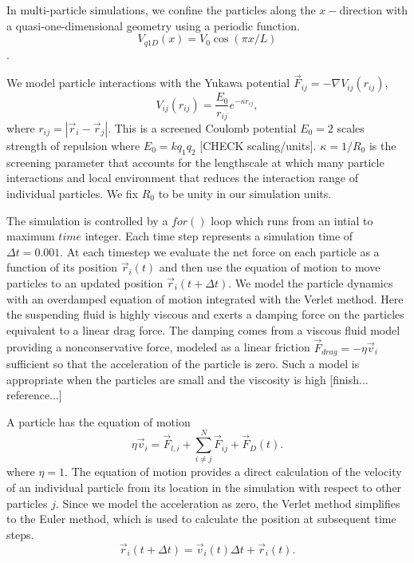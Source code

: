 \documentclass[prb,preprint]{revtex4}
\begin{document}
 In multi-particle simulations, we confine
 the particles along the $x-$direction with a
 quasi-one-dimensional geometry
 using a periodic function.
 \begin{equation}
   V_{q1D}(x) = V_0 \cos{(\pi x / L)}
 \end{equation}.
 
 We model particle interactions with
 the Yukawa potential $\vec{F}_{ij} = -\nabla V_{ij}(r_{ij})$,
 \begin{equation}
   V_{ij}(r_{ij}) = \frac{E_0}{r_{ij}} e^{-\kappa r_{ij}},
 \end{equation}
 where $r_{ij} = |\vec{r}_i - \vec{r}_j|$.
 This is a
 screened Coulomb potential
 $E_0=2$ scales strength of repulsion
 where $E_0 = k q_1 q_2$  [CHECK scaling/units].
 $\kappa = 1/R_0$ is the screening parameter 
that accounts for the lengthscale at
which many particle
interactions and local environment
that reduces the interaction range of individual particles.
We fix $R_0$ to be unity in our simulation units.

The simulation is controlled by a $for()$ loop
which runs from an intial to maximum $time$ integer.
Each time step represents a simulation time of $\Delta t=0.001$.
At each timestep
we evaluate the net force on each particle as a function of its position
$\vec{r}_i(t)$
and then use the equation of motion to move particles
to an updated position
$\vec{r}_i(t+\Delta t)$.
%
We model the 
particle dynamics 
with an overdamped
equation of motion
integrated with the Verlet method.
Here 
the suspending fluid is highly viscous
and exerts a damping force on the particles equivalent
to a linear drag force.
The damping comes from a viscous fluid model
providing a nonconservative force,
modeled as a linear friction $\vec{F}_{drag} = -\eta \vec{v}_i$
sufficient so that
the acceleration of the particle is zero.
Such a model is appropriate when the particles
are small and the viscosity is high [finish... reference...]

A particle has the equation of motion 
\begin{equation}
\eta \vec{v}_i = \vec{F}_{l,i} + \sum_{i \neq j}^{N} \vec{F}_{ij} + \vec{F}_{D}(t).
\end{equation}
where $\eta = 1$.
The equation of motion provides a direct calculation of the velocity
of an individual particle from its location in the simulation
with respect to other particles $j$.
Since we model the acceleration as zero,
the Verlet method simplifies to 
the Euler method,
which is used to calculate the position at subsequent time steps.
\begin{equation}
\vec{r}_i(t+\Delta t) = \vec{v}_i(t) \Delta t + \vec{r}_i(t).
\end{equation}
\end{document}

